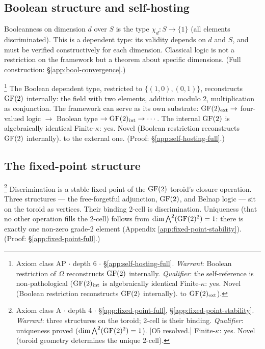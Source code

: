\subsection{Boolean structure and self-hosting}

\begin{proposition}
\label{prop:bool-dependent}
Booleanness on dimension $d$ over $S$ is the type
$\chi_d: S \to \{1\}$ (all elements discriminated). This
is a dependent type: its validity depends on $d$ and $S$,
and must be verified constructively for each dimension.
Classical logic is not a restriction on the framework but a
theorem about specific dimensions.
(Full construction: \S\ref{app:bool-convergence}.)
\end{proposition}

\begin{theorem}\label{thm:self-hosting}\footnote{Axiom class \textsf{AP} $\cdot$ depth 6 $\cdot$ \S\ref{app:self-hosting-full}.  \emph{Warrant}: Boolean restriction of $\Omega$ reconstructs $\operatorname{GF}(2)$ internally. \emph{Qualifier}: the self-reference is non-pathological ($\operatorname{GF}(2)_{\mathrm{int}}$ is algebraically identical Finite-$\kappa$: yes. Novel (Boolean restriction reconstructs $\operatorname{GF}(2)$ internally). to $\operatorname{GF}(2)_{\mathrm{ext}}$).}
The Boolean dependent type, restricted to
$\{(1,0), (0,1)\}$, reconstructs $\operatorname{GF}(2)$ internally:
the field with two elements, addition modulo 2,
multiplication as conjunction. The framework can serve as
its own substrate: $\operatorname{GF}(2)_{\mathrm{ext}} \to$
four-valued logic $\to$ Boolean type $\to
\operatorname{GF}(2)_{\mathrm{int}} \to \cdots$. The internal
$\operatorname{GF}(2)$ is algebraically identical Finite-$\kappa$: yes. Novel (Boolean restriction reconstructs $\operatorname{GF}(2)$ internally). to the external one.
(Proof: \S\ref{app:self-hosting-full}.)
\end{theorem}

\subsection{The fixed-point structure}

\begin{theorem}\footnote{Axiom class \textsf{A} $\cdot$ depth 4 $\cdot$ \S\ref{app:fixed-point-full}, \S\ref{app:fixed-point-stability}.  \emph{Warrant}: three structures on the toroid; 2-cell is their binding. \emph{Qualifier}: uniqueness proved ($\dim \bigwedge^2(\operatorname{GF}(2)^2) = 1$). [O5 resolved.] Finite-$\kappa$: yes. Novel (toroid geometry determines the unique 2-cell).}
\label{thm:entailed}
Discrimination is a stable fixed point of the $\operatorname{GF}(2)$
toroid's closure operation. Three structures --- the
free-forgetful adjunction, $\operatorname{GF}(2)$, and Belnap logic ---
sit on the toroid as vertices. Their binding 2-cell is
discrimination. Uniqueness (that no other operation fills
the 2-cell) follows from $\dim \bigwedge^2(\operatorname{GF}(2)^2) = 1$: there is exactly one non-zero grade-2 element
(Appendix \ref{app:fixed-point-stability}).
(Proof: \S\ref{app:fixed-point-full}.)
\end{theorem}

